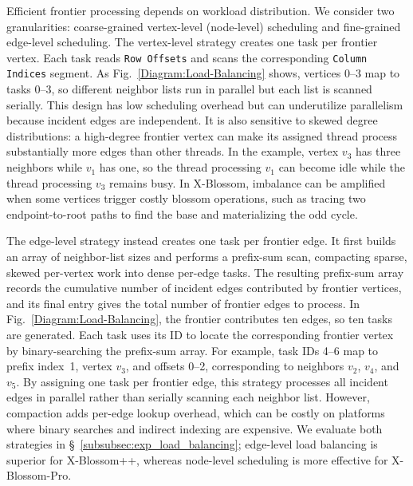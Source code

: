 Efficient frontier processing depends on workload distribution.
We consider two granularities: coarse-grained vertex-level (node-level) scheduling and fine-grained edge-level scheduling.
The vertex-level strategy creates one task per frontier vertex.
Each task reads \texttt{Row Offsets} and scans the corresponding \texttt{Column Indices} segment.
As Fig.~\ref{Diagram:Load-Balancing} shows, vertices 0--3 map to tasks 0--3, so different neighbor lists run in parallel but each list is scanned serially.
This design has low scheduling overhead but can underutilize parallelism because incident edges are independent.
It is also sensitive to skewed degree distributions: a high-degree frontier vertex can make its assigned thread process substantially more edges than other threads.
In the example, vertex $v_3$ has three neighbors while $v_1$ has one, so the thread processing $v_1$ can become idle while the thread processing $v_3$ remains busy.
In X-Blossom, imbalance can be amplified when some vertices trigger costly blossom operations, such as tracing two endpoint-to-root paths to find the base and materializing the odd cycle.

The edge-level strategy instead creates one task per frontier edge.
It first builds an array of neighbor-list sizes and performs a prefix-sum scan, compacting sparse, skewed per-vertex work into dense per-edge tasks.
The resulting prefix-sum array records the cumulative number of incident edges contributed by frontier vertices, and its final entry gives the total number of frontier edges to process.
In Fig.~\ref{Diagram:Load-Balancing}, the frontier contributes ten edges, so ten tasks are generated.
Each task uses its ID to locate the corresponding frontier vertex by binary-searching the prefix-sum array.
For example, task IDs 4--6 map to prefix index~1, vertex $v_3$, and offsets 0--2, corresponding to neighbors $v_2$, $v_4$, and $v_5$.
By assigning one task per frontier edge, this strategy processes all incident edges in parallel rather than serially scanning each neighbor list.
However, compaction adds per-edge lookup overhead, which can be costly on platforms where binary searches and indirect indexing are expensive.
We evaluate both strategies in \S~\ref{subsubsec:exp_load_balancing}; edge-level load balancing is superior for X-Blossom++, whereas node-level scheduling is more effective for X-Blossom-Pro.

